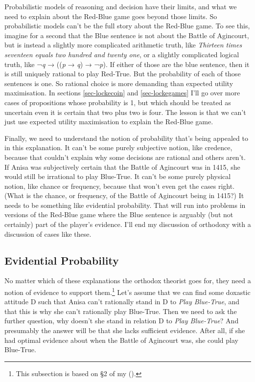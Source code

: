\documentclass[
  12pt,
  letterpaper,
]{scrbook}
\begin{document}
Probabilistic models of reasoning and decision have their limits, and
what we need to explain about the Red-Blue game goes beyond those
limits. So probabilistic models can't be the full story about the
Red-Blue game. To see this, imagine for a second that the Blue sentence
is not about the Battle of Agincourt, but is instead a slightly more
complicated arithmetic truth, like \emph{Thirteen times seventeen equals
two hundred and twenty one}, or a slightly complicated logical truth,
like ¬\emph{q} → ((\emph{p} → \emph{q}) → ¬\emph{p}). If either of those
are the blue sentence, then it is still uniquely rational to play
Red-True. But the probability of each of those sentences is one. So
rational choice is more demanding than expected utility maximisation. In
sections \ref{sec-lockecoin} and \ref{sec-lockegames} I'll go over more
cases of propositions whose probability is 1, but which should be
treated as uncertain even it is certain that two plus two is four. The
lesson is that we can't just use expected utility maximisation to
explain the Red-Blue game.

Finally, we need to understand the notion of probability that's being
appealed to in this explanation. It can't be some purely subjective
notion, like credence, because that couldn't explain why some decisions
are rational and others aren't. If Anisa was subjectively certain that
the Battle of Agincourt was in 1415, she would still be irrational to
play Blue-True. It can't be some purely physical notion, like chance or
frequency, because that won't even get the cases right. (What is the
chance, or frequency, of the Battle of Agincourt being in 1415?) It
needs to be something like evidential probability. That will run into
problems in versions of the Red-Blue game where the Blue sentence is
arguably (but not certainly) part of the player's evidence. I'll end my
discussion of orthodoxy with a discussion of cases like these.

\subsection{Evidential Probability}\label{sec-orthodoxevidence}

No matter which of these explanations the orthodox theorist goes for,
they need a notion of evidence to support them.\footnote{This subsection
  is based on §2 of my ().}
Let's assume that we can find some doxastic attitude D such that Anisa
can't rationally stand in D to \emph{Play Blue-True}, and that this is
why she can't rationally play Blue-True. Then we need to ask the further
question, why doesn't she stand in relation D to \emph{Play Blue-True}?
And presumably the answer will be that she lacks sufficient evidence.
After all, if she had optimal evidence about when the Battle of
Agincourt was, she could play Blue-True.
\end{document}
